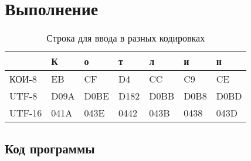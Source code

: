 \section{Выполнение}
\begin{table}[ht]
\center
\begin{tabular}{| l | l | l | l | l | l | l |}
\hline
& К    & о    & т    & л    & и    & н    \\
\hline
    КОИ-8  & EB   & CF   & D4   & CC   & C9   & CE   \\
    \hline
    UTF-8  & D09A & D0BE & D182 & D0BB & D0B8 & D0BD \\
    \hline
    UTF-16 & 041A & 043E & 0442 & 043B & 0438 & 043D \\
    \hline
  \end{tabular}
  \caption{Строка для ввода в разных кодировках}
\end{table}

\subsection{Код программы}


